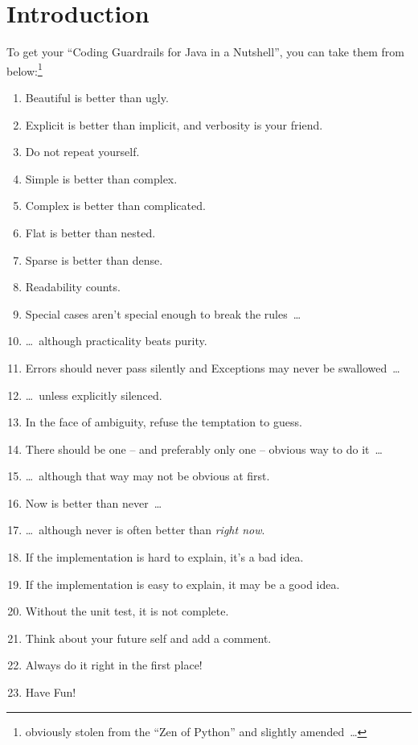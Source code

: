 \documentclass[11pt,a4paper, titlepage, parskip=half, headsepline, footsepline, cleardoublepage=current, headheight=1cm]{scrbook}
\begin{document}
\chapter{Introduction}\label{sec:Introduction}
To get your “Coding Guardrails for Java in a Nutshell”, you can take them from below:\footnote{obviously stolen from the “Zen of Python”\autocite{WIKIPEDIA:ZenOfPython,PYTHON_ORG_MAILING_LIST:ThePythonWay} and slightly amended~…}
\begin{enumerate}[nosep]\label{lst:NutshellGuardrails}
	\item{Beautiful is better than ugly.}\label{lst:ZoP:BeautifulVsUgly}
	\item{Explicit is better than implicit, and verbosity is your friend.}\label{lst:ZoP:ExplicitVsImplicit}
	\item{Do not repeat yourself.}\label{lst:ZoP:DRY}
	\item{Simple is better than complex.}\label{lst:ZoP:SimpleVsComplex}
	\item{Complex is better than complicated.}\label{lst:ZoP:ComplexVsComplicated}
	\item{Flat is better than nested.}\label{lst:ZoP:FlatVsNested}
	\item{Sparse is better than dense.}\label{lst:ZoP:SparseVsDense}
	\item{Readability counts.}\label{lst:ZoP:Readablity}
	\item{Special cases aren't special enough to break the rules~…}\label{lst:ZoP:SpecialCases}
	\item{…~although practicality beats purity.}\label{lst:ZoP:Practicality}
	\item{Errors should never pass silently and Exceptions may never be swallowed~…}\label{lst:ZoP:ErrorsMayNeverBeSwallowed}
	\item{…~unless explicitly silenced.}\label{lst:ZoP:ErrorsAreSilenced}
	\item{In the face of ambiguity, refuse the temptation to guess.}\label{lst:ZoP:DontGuess}
	\item{There should be one – and preferably only one – obvious way to do it~…}\label{lst:ZoP:OneWay}
	\item{…~although that way may not be obvious at first.}
	\item{Now is better than never~…}\label{lst:ZoP:Now}
	\item{…~although never is often better than \textit{right now}.}\label{lst:ZoP:RightNow}
	\item{If the implementation is hard to explain, it's a bad idea.}\label{lst:ZoP:BadIdea}
	\item{If the implementation is easy to explain, it may be a good idea.}\label{lst:ZoP:GoodIdea}
	\item{Without the unit test, it is not complete.}\label{lst:ZoP:NotCompleteWithoutTest}
	\item{Think about your future self and add a comment.}\label{lst:ZoP:FutureSelf}
	\item{Always do it right in the first place!}\label{lst:ZoP:BasicRule}
	\item{Have Fun!}\label{lst:ZoP:HaveFun}
\end{enumerate}
\end{document}

